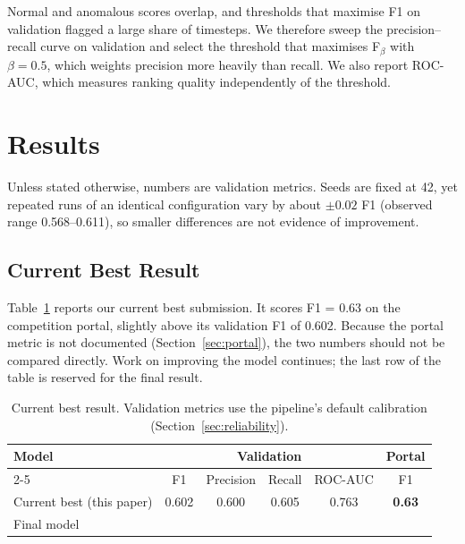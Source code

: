 \documentclass[runningheads]{llncs}
\newcommand{\portalFone}{0.63}
\newcommand{\valFone}{0.602}
\newcommand{\valPrec}{0.600}
\newcommand{\valRec}{0.605}
\newcommand{\valAUC}{0.763}
\newif\ifshowplaceholders
\newcommand{\placeholder}[1]{\ifshowplaceholders\textcolor{red}{\textbf{[#1]}}\fi}
\newcommand{\finalFone}{\placeholder{FINAL F1 SCORE TO BE UPDATED}}
\begin{document}
Normal and anomalous scores overlap, and thresholds that maximise F1 on validation flagged a large share of timesteps. We therefore sweep the precision--recall curve on validation and select the threshold that maximises F$_\beta$ with $\beta = 0.5$, which weights precision more heavily than recall. We also report ROC-AUC, which measures ranking quality independently of the threshold.

\section{Results}

Unless stated otherwise, numbers are validation metrics. Seeds are fixed at 42, yet repeated runs of an identical configuration vary by about $\pm 0.02$ F1 (observed range 0.568--0.611), so smaller differences are not evidence of improvement.

\subsection{Current Best Result}

Table~\ref{tab:main} reports our current best submission. It scores F1 = \portalFone{} on the competition portal, slightly above its validation F1 of \valFone. Because the portal metric is not documented (Section~\ref{sec:portal}), the two numbers should not be compared directly. Work on improving the model continues; the last row of the table is reserved for the final result.

\begin{table}[ht]
\centering
\caption{Current best result. Validation metrics use the pipeline's default calibration (Section~\ref{sec:reliability}).}\label{tab:main}
\begin{tabular}{lccccc}
\toprule
Model & \multicolumn{4}{c}{Validation} & Portal \\
\cmidrule(lr){2-5}
 & F1 & Precision & Recall & ROC-AUC & F1 \\
\midrule
Current best (this paper) & \valFone & \valPrec & \valRec & \valAUC & \textbf{\portalFone} \\
Final model & \multicolumn{5}{c}{\finalFone} \\
\bottomrule
\end{tabular}
\end{table}
\end{document}
